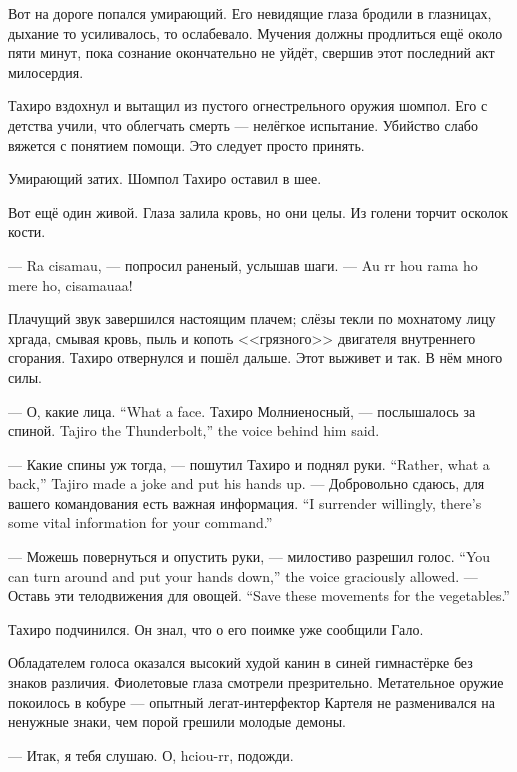 Вот на дороге попался умирающий.
Его невидящие глаза бродили в глазницах, дыхание то усиливалось, то ослабевало.
Мучения должны продлиться ещё около пяти минут, пока сознание окончательно не уйдёт, свершив этот последний акт милосердия.

Тахиро вздохнул и вытащил из пустого огнестрельного оружия шомпол.
Его с детства учили, что облегчать смерть --- нелёгкое испытание.
Убийство слабо вяжется с понятием помощи.
Это следует просто принять.

Умирающий затих.
Шомпол Тахиро оставил в шее.

Вот ещё один живой.
Глаза залила кровь, но они целы.
Из голени торчит осколок кости.

--- Ra cisamau, --- попросил раненый, услышав шаги.
--- Au rr hou rama ho mere ho, cisamauaa\FM!

Плачущий звук завершился настоящим плачем;
слёзы текли по мохнатому лицу хргада, смывая кровь, пыль и копоть <<грязного>> двигателя внутреннего сгорания.
Тахиро отвернулся и пошёл дальше.
Этот выживет и так.
В нём много силы.

{--- О, какие лица.}
{``What a face.}
{Тахиро Молниеносный, --- послышалось за спиной.}
{Tajiro the Thunderbolt,'' the voice behind him said.}

{--- Какие спины уж тогда, --- пошутил Тахиро и поднял руки.}
{``Rather, what a back,'' Tajiro made a joke and put his hands up.}
{--- Добровольно сдаюсь, для вашего командования есть важная информация.}
{``I surrender willingly, there's some vital information for your command.''}

{--- Можешь повернуться и опустить руки, --- милостиво разрешил голос.}
{``You can turn around and put your hands down,'' the voice graciously allowed.}
{--- Оставь эти телодвижения для овощей\FM.}
{``Save these movements for the vegetables\FM.''}

Тахиро подчинился.
Он знал, что о его поимке уже сообщили Гало.

Обладателем голоса оказался высокий худой канин в синей гимнастёрке без знаков различия.
Фиолетовые глаза смотрели презрительно.
Метательное оружие покоилось в кобуре --- опытный легат-интерфектор Картеля не разменивался на ненужные знаки, чем порой грешили молодые демоны.

--- Итак, я тебя слушаю.
О, hciou-rr\FM, подожди.

